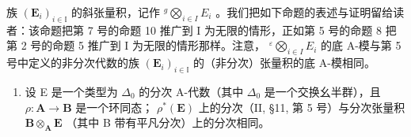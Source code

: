 族 \((\mathbf{E}_{i})_{i\in\mathbb{I}}\) 的斜张量积，记作 \({}^{g}\bigotimes_{i\in I}E_{i}\) 。我们把如下命题的表述与证明留给读者：该命题把第 7 号的命题 10 推广到 I 为无限的情形，正如第 5 号的命题 8 把第 2 号的命题 5 推广到 I 为无限的情形那样。注意， \({}^{\varepsilon}\bigotimes_{i\in I}E_{i}\) 的底 A-模与第 5 号中定义的非分次代数的族 \((\mathbf{E}_{i})_{i\in\mathbb{I}}\) 的（非分次）张量积的底 A-模相同。

\begin{enumerate}
\def\labelenumi{(\arabic{enumi})}
\setcounter{enumi}{1}
\tightlist
\item
  设 E 是一个类型为 \(\Delta_0\) 的分次 A-代数（其中 \(\Delta_0\) 是一个交换幺半群），且 \(\rho: \mathbf{A} \to \mathbf{B}\) 是一个环同态； \(\rho^*(\mathbf{E})\) 上的分次（II, §11, 第 5 号）与分次张量积 \(\mathbf{B} \otimes_{\mathbf{A}} \mathbf{E}\) （其中 B 带有平凡分次）上的分次相同。
\end{enumerate}
